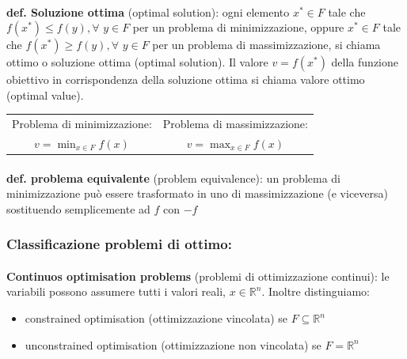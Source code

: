 \documentclass[a4paper, 11pt]{article}
\begin{document}
        \paragraph{}
        \textbf{def. Soluzione ottima} (optimal solution): ogni elemento $x^*\in F$ tale che $f(x^*) \le f(y), \forall$ $y \in F$ per un problema di minimizzazione, oppure $x^*\in F$ tale che $f(x^*) \ge f(y), \forall$ $y \in F$  per un problema di massimizzazione, si chiama ottimo o soluzione ottima (optimal solution). Il valore $v = f(x^*)$ della funzione obiettivo in corrispondenza della soluzione ottima si chiama valore ottimo (optimal value).

        \begin{table}[ht]
            \centering
            \begin{tabular}{c|c}
                Problema di minimizzazione: & Problema di massimizzazione: \\
                $v = \min_{x \in F} f(x)$   & $v = \max_{x \in F} f(x)$ \\   
            \end{tabular}
        \end{table}  

        \paragraph{}
        \textbf{def. problema equivalente} (problem equivalence): un problema di minimizzazione può essere trasformato in uno di massimizzazione (e viceversa) sostituendo semplicemente ad $f$ con $-f$

        \subsubsection*{Classificazione problemi di ottimo:}
            \paragraph{}
            \textbf{Continuos optimisation problems} (problemi di ottimizzazione continui): le variabili possono assumere tutti i valori reali, $x \in \mathbb{R}^n$. Inoltre distinguiamo:
            
            \begin{itemize}
                \item constrained optimisation (ottimizzazione vincolata) se $F \subseteq \mathbb{R}^n$
                \item unconstrained optimisation (ottimizzazione non vincolata) se $F = \mathbb{R}^n$
            \end{itemize}
\end{document}
